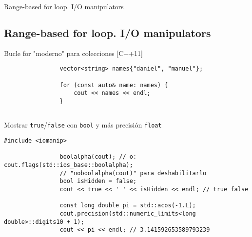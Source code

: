 \documentclass{beamer}
\newcommand{\normalSizeItem}[1] {
  \normalsize{\item #1}
}
\begin{document}
		\begin{frame}[fragile]{Range-based for loop. I/O manipulators}	
			\subsection{Range-based for loop. I/O manipulators}		
			\begin{itemize}
			
				\normalSizeItem { Bucle for "moderno" para colecciones [C++11] }
				\begin{lstlisting}
				vector<string> names{"daniel", "manuel"};
				
				for (const auto& name: names) {
					cout << names << endl;
				}
				
				\end{lstlisting}
				
				\normalSizeItem { Mostrar \texttt{true}/\texttt{false} con \texttt{bool} y más precisión \texttt{float} }
				\begin{lstlisting}[basicstyle={\tiny\ttfamily}]
				#include <iomanip>
				
				boolalpha(cout); // o: cout.flags(std::ios_base::boolalpha);
				// "noboolalpha(cout)" para deshabilitarlo
				bool isHidden = false;
				cout << true << ' ' << isHidden << endl; // true false
				
				const long double pi = std::acos(-1.L);
				cout.precision(std::numeric_limits<long double>::digits10 + 1);
				cout << pi << endl; // 3.141592653589793239
				\end{lstlisting}
				
			\end{itemize}
		\end{frame}
		
\end{document}
